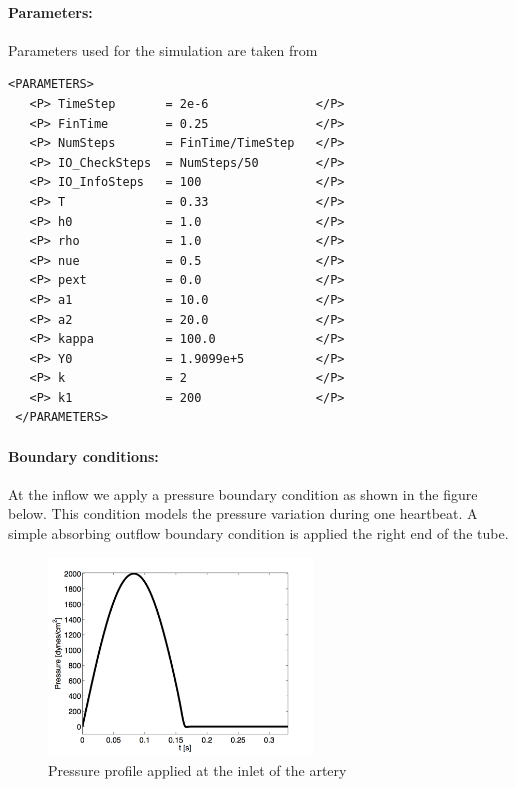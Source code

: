 \paragraph{Parameters:~} Parameters used for the simulation are taken from \cite{ShFoPeFr03} 
\begin{lstlisting}[style=XMLStyle] 
<PARAMETERS>
   <P> TimeStep       = 2e-6               </P> 
   <P> FinTime        = 0.25               </P>
   <P> NumSteps       = FinTime/TimeStep   </P>
   <P> IO_CheckSteps  = NumSteps/50        </P>
   <P> IO_InfoSteps   = 100                </P>
   <P> T              = 0.33               </P>
   <P> h0             = 1.0                </P>
   <P> rho            = 1.0                </P>
   <P> nue            = 0.5                </P>
   <P> pext           = 0.0                </P> 
   <P> a1             = 10.0               </P> 
   <P> a2             = 20.0               </P> 
   <P> kappa          = 100.0              </P> 
   <P> Y0             = 1.9099e+5          </P> 
   <P> k              = 2                  </P> 
   <P> k1             = 200                </P> 
 </PARAMETERS>
\end{lstlisting}

\paragraph{Boundary conditions:~} At the inflow we apply a pressure boundary condition as shown in the figure below. This condition models the pressure variation during one heartbeat. A simple absorbing outflow boundary condition is applied the right end of the tube.

\begin{figure}
\begin{center}
\includegraphics[width=7cm]{img/StentPressureProfile.png}
\caption{Pressure profile applied at the inlet of the artery}
\end{center}
\end{figure}

